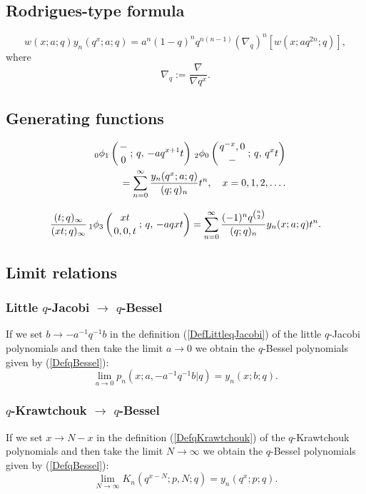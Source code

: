 \documentclass[envcountchap,graybox]{svmono}
\newcommand{\qhyp}[5]{\mbox{}_{#1}{\phi}_{#2}
\left(\genfrac{}{}{0pt}{}{#3}{#4}\,;\,q,\,#5\right)}
\newcommand{\qhyp}[5]{\,\mbox{}_{#1}\phi_{#2}\!\left(
  \genfrac{}{}{0pt}{}{#3}{#4};#5\right)}
\begin{document}
{{\subsection*{Rodrigues-type formula}
\begin{equation}
\label{RodqBessel}
w(x;a;q)y_n(q^x;a;q)=a^n(1-q)^nq^{n(n-1)}\left(\nabla_q\right)^n\left[w(x;aq^{2n};q)\right],
\end{equation}
where
$$\nabla_q:=\frac{\nabla}{\nabla q^x}.$$

\subsection*{Generating functions}
\begin{eqnarray}
\label{GenqBessel1}
& &\qhyp{0}{1}{-}{0}{-aq^{x+1}t}\,\qhyp{2}{0}{q^{-x},0}{-}{q^xt}\nonumber\\
& &{}=\sum_{n=0}^{\infty}\frac{y_n(q^x;a;q)}{(q;q)_n}t^n,\quad x=0,1,2,\ldots.
\end{eqnarray}

\begin{equation}
\label{GenqBessel2}
\frac{(t;q)_{\infty}}{(xt;q)_{\infty}}\,\qhyp{1}{3}{xt}{0,0,t}{-aqxt}=
\sum_{n=0}^{\infty}\frac{(-1)^nq^{\binom{n}{2}}}{(q;q)_n}y_n(x;a;q)t^n.
\end{equation}

\subsection*{Limit relations}

\subsubsection*{Little $q$-Jacobi $\rightarrow$ $q$-Bessel}
If we set $b\rightarrow -a^{-1}q^{-1}b$ in the definition (\ref{DefLittleqJacobi}) of
the little $q$-Jacobi polynomials and then take the limit $a\rightarrow 0$ we obtain
the $q$-Bessel polynomials given by (\ref{DefqBessel}):
$$\lim_{a\rightarrow 0}p_n(x;a,-a^{-1}q^{-1}b|q)=y_n(x;b;q).$$

\subsubsection*{$q$-Krawtchouk $\rightarrow$ $q$-Bessel}
If we set $x\rightarrow N-x$ in the definition (\ref{DefqKrawtchouk}) of the
$q$-Krawtchouk polynomials and then take the limit $N\rightarrow\infty$ we
obtain the $q$-Bessel polynomials given by (\ref{DefqBessel}):
$$\lim_{N\rightarrow\infty}K_n(q^{x-N};p,N;q)=y_n(q^x;p;q).$$

}}
\end{document}
